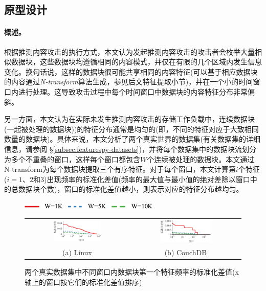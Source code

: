 \subsection{原型设计}
\label{subsec:featurespy-basic}

\paragraph*{概述。}

根据推测内容攻击的执行方式，本文认为发起推测内容攻击的攻击者会枚举大量相似数据块，这些数据块均遵循相同的内容模式，并仅在有限的几个区域内发生信息变化。换句话说，这样的数据块很可能共享相同的内容特征(可以基于相应数据块的内容通过\textit{N-transform}算法生成，参见后文特征提取小节)，并在一个小的时间窗口内进行处理。这导致攻击过程中每个时间窗口中数据块的内容特征分布非常偏斜。

另一方面，本文认为在实际未发生推测内容攻击的存储工作负载中，连续数据块(一起被处理的数据块))的特征分布通常是均匀的(即，不同的特征对应于大致相同数量的数据块)。具体来说，本文分析了两个真实世界的数据集(有关数据集的详细信息，请参阅 \S\ref{subsec:featurespy-datasets})，并将每个数据集中的数据块流划分为多个不重叠的窗口，这样每个窗口都包含$W$个连续被处理的数据块。本文通过N-transform为每个数据块提取三个有序特征。对于每个窗口，本文计算第$i$个特征($i=1$、$2$和$3$)出现频率的标准化差值(频率的最大值与最小值的绝对差除以窗口中的总数据块个数)，窗口的标准化差值越小，则表示对应的特征分布越均匀。

\begin{figure}[!htb]
    \centering
    \includegraphics[height=3mm]{pic/featurespy/plot/featureDistribution/featureDistributionLegend.pdf}
    \begin{tabular}{cc}
        \includegraphics[width=0.477\textwidth]{pic/featurespy/plot/featureDistribution/featureDistributionLinux.pdf} &
        \includegraphics[width=0.477\textwidth]{pic/featurespy/plot/featureDistribution/featureDistributionCouchbase.pdf}                    \\
        {\small (a) Linux}                                                                                            & {\small (b) CouchDB} \\
    \end{tabular}
    \caption{两个真实数据集中不同窗口内数据块第一个特征频率的标准化差值(x轴上的窗口按它们的标准化差值排序)}
    \label{fig:featurespy-featureDistribution}
\end{figure}

